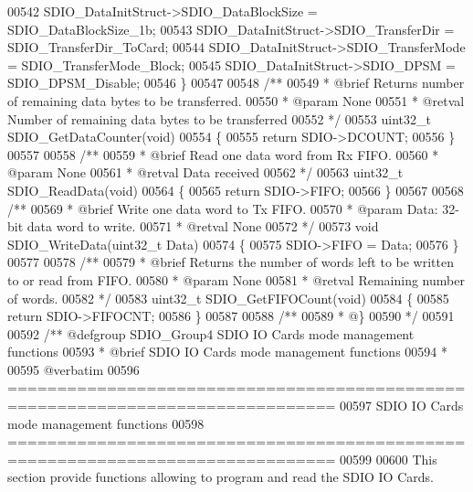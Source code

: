 \begin{DoxyCode}
00542   SDIO\_DataInitStruct->SDIO_DataBlockSize = SDIO_DataBlockSize_1b;
00543   SDIO\_DataInitStruct->SDIO_TransferDir = SDIO_TransferDir_ToCard;
00544   SDIO\_DataInitStruct->SDIO_TransferMode = SDIO_TransferMode_Block;
00545   SDIO\_DataInitStruct->SDIO_DPSM = SDIO_DPSM_Disable;
00546 \}
00547 
00548 \textcolor{comment}{/**}
00549 \textcolor{comment}{  * @brief  Returns number of remaining data bytes to be transferred.}
00550 \textcolor{comment}{  * @param  None}
00551 \textcolor{comment}{  * @retval Number of remaining data bytes to be transferred}
00552 \textcolor{comment}{  */}
00553 uint32\_t SDIO_GetDataCounter(\textcolor{keywordtype}{void})
00554 \{
00555   \textcolor{keywordflow}{return} SDIO->DCOUNT;
00556 \}
00557 
00558 \textcolor{comment}{/**}
00559 \textcolor{comment}{  * @brief  Read one data word from Rx FIFO.}
00560 \textcolor{comment}{  * @param  None}
00561 \textcolor{comment}{  * @retval Data received}
00562 \textcolor{comment}{  */}
00563 uint32\_t SDIO_ReadData(\textcolor{keywordtype}{void})
00564 \{
00565   \textcolor{keywordflow}{return} SDIO->FIFO;
00566 \}
00567 
00568 \textcolor{comment}{/**}
00569 \textcolor{comment}{  * @brief  Write one data word to Tx FIFO.}
00570 \textcolor{comment}{  * @param  Data: 32-bit data word to write.}
00571 \textcolor{comment}{  * @retval None}
00572 \textcolor{comment}{  */}
00573 \textcolor{keywordtype}{void} SDIO_WriteData(uint32\_t Data)
00574 \{
00575   SDIO->FIFO = Data;
00576 \}
00577 
00578 \textcolor{comment}{/**}
00579 \textcolor{comment}{  * @brief  Returns the number of words left to be written to or read from FIFO.    }
00580 \textcolor{comment}{  * @param  None}
00581 \textcolor{comment}{  * @retval Remaining number of words.}
00582 \textcolor{comment}{  */}
00583 uint32\_t SDIO_GetFIFOCount(\textcolor{keywordtype}{void})
00584 \{
00585   \textcolor{keywordflow}{return} SDIO->FIFOCNT;
00586 \}
00587 
00588 \textcolor{comment}{/**}
00589 \textcolor{comment}{  * @\}}
00590 \textcolor{comment}{  */}
00591 
00592 \textcolor{comment}{/** @defgroup SDIO\_Group4 SDIO IO Cards mode management functions}
00593 \textcolor{comment}{ *  @brief   SDIO IO Cards mode management functions}
00594 \textcolor{comment}{ *}
00595 \textcolor{comment}{@verbatim   }
00596 \textcolor{comment}{ ===============================================================================}
00597 \textcolor{comment}{              SDIO IO Cards mode management functions}
00598 \textcolor{comment}{ ===============================================================================  }
00599 \textcolor{comment}{}
00600 \textcolor{comment}{  This section provide functions allowing to program and read the SDIO IO Cards.}

\end{DoxyCode}
